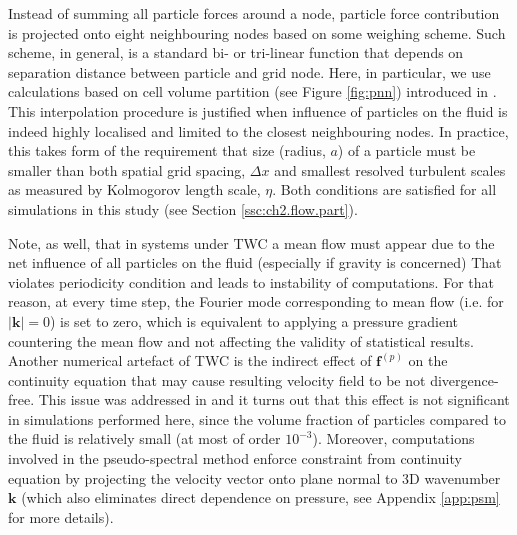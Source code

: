 \documentclass{pracamgren}
\begin{document}
Instead of summing all particle forces around a node, particle force contribution is projected onto eight neighbouring nodes based on some weighing scheme.
Such scheme, in general, is a standard bi- or tri-linear function that depends on separation distance between particle and grid node.
Here, in particular, we use calculations based on cell volume partition (see Figure \ref{fig:pnn}) introduced in \textcite{Squires1990}.
This interpolation procedure is justified when influence of particles on the fluid is indeed highly localised and limited to the closest neighbouring nodes.
In practice, this takes form of the requirement that size (radius, $a$) of a particle must be smaller than both spatial grid spacing, $\Delta x$ and smallest resolved turbulent scales as measured by Kolmogorov length scale, $\eta$.
Both conditions are satisfied for all simulations in this study (see Section \ref{ssc:ch2.flow.part}).

Note, as well, that in systems under TWC a mean flow must appear due to the net influence of all particles on the fluid (especially if gravity is concerned)
That violates periodicity condition and leads to instability of computations.
For that reason, at every time step, the Fourier mode corresponding to mean flow (i.e. for $|\mathbf{k}| = 0$) is set to zero, which is equivalent to applying a pressure gradient countering the mean flow and not affecting the validity of statistical results.
Another numerical artefact of TWC is the indirect effect of $\textbf{f}^{(p)}$ on the continuity equation that may cause resulting velocity field to be not divergence-free.
This issue was addressed in \textcite{Rosa2020} and it turns out that this effect is not significant in simulations performed here, since the volume fraction of particles compared to the fluid is relatively small (at most of order $10^{-3}$).
Moreover, computations involved in the pseudo-spectral method enforce constraint from continuity equation by projecting the velocity vector onto plane normal to 3D wavenumber $\mathbf{k}$ (which also eliminates direct dependence on pressure, see Appendix \ref{app:psm} for more details).
\end{document}

